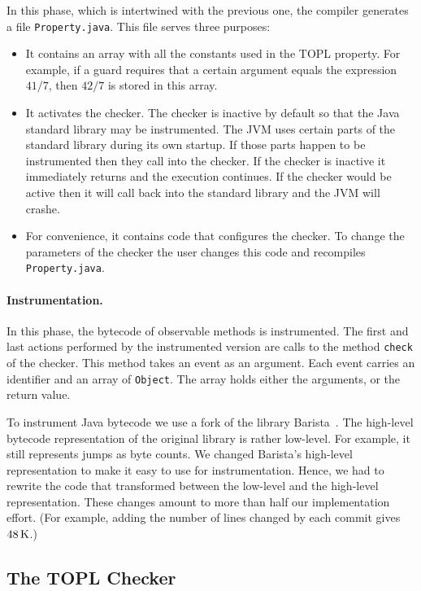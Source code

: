 \documentclass[10pt, preprint]{sigplanconf} %
\begin{document}
In this phase, which is intertwined with the previous one, the compiler generates a file {\tt Property.java}.
This file serves three purposes:
\begin{itemize}
\item
It contains an array with all the constants used in the TOPL property.
For example, if a guard requires that a certain argument equals the expression~$41/7$, then $42/7$ is stored in this array.
\item
It activates the checker.
The checker is inactive by default so that the Java standard library may be instrumented.
The JVM uses certain parts of the standard library during its own startup.
If those parts happen to be instrumented then they call into the checker.
If the checker is inactive it immediately returns and the execution continues.
If the checker would be active then it will call back into the standard library and the JVM will crashe.
\item
For convenience, it contains code that configures the checker.
To change the parameters of the checker the user changes this code and recompiles {\tt Property.java}.
\end{itemize}

\paragraph{Instrumentation.}

In this phase, the bytecode of observable methods is instrumented.
The first and last actions performed by the instrumented version are calls to the method {\tt check} of the checker.
This method takes an event as an argument.
Each event carries an identifier and an array of {\tt Object}.
The array holds either the arguments, or the return value.

To instrument Java bytecode we use a fork of the library Barista~\cite{barista}.
The high-level bytecode representation of the original library is rather low-level.
For example, it still represents jumps as byte counts.
We changed Barista's high-level representation to make it easy to use for instrumentation.
Hence, we had to rewrite the code that transformed between the low-level and the high-level representation.
These changes amount to more than half our implementation effort.
(For example, adding the number of lines changed by each commit gives $48\rm\,K$.)

\subsection{The TOPL Checker} %
\end{document}
